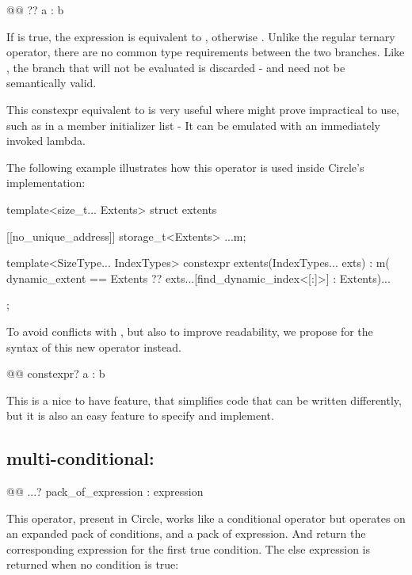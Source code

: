 \documentclass{wg21}
\begin{document}
\begin{colorblock}
@@ ?? a : b
\end{colorblock}

If  is true, the expression is equivalent to , otherwise .
Unlike the regular ternary operator, there are no common type requirements between the two branches.
Like , the branch that will not be evaluated is discarded - and need not be semantically valid.

This constexpr equivalent to  is very useful where  might prove impractical to use, such as
in a member initializer list - It can be emulated with an immediately invoked lambda.

The following example illustrates how this operator is used inside Circle's  implementation:

\begin{colorblock}
template<size_t... Extents>
struct extents {
    [[no_unique_address]] storage_t<Extents> ...m;

    template<SizeType... IndexTypes>
    constexpr extents(IndexTypes... exts) :
        m( dynamic_extent == Extents ??  exts...[find_dynamic_index<[:]>] : Extents)... { }
};
\end{colorblock}

To avoid conflicts with , but also to improve readability, we propose  for the syntax of this new operator instead.

\begin{colorblock}
@@ constexpr? a : b
\end{colorblock}

This is a nice to have feature, that simplifies code that can be written differently, but it is also an easy feature to specify and implement.

\subsection{multi-conditional: }

\begin{colorblock}
@@ ...? pack_of_expression : expression
\end{colorblock}

This operator, present in Circle, works like a conditional operator but operates on an expanded pack of conditions, and a pack of expression.
And return the corresponding expression for the first true condition. The else expression is returned when no condition is true:
\end{document}
